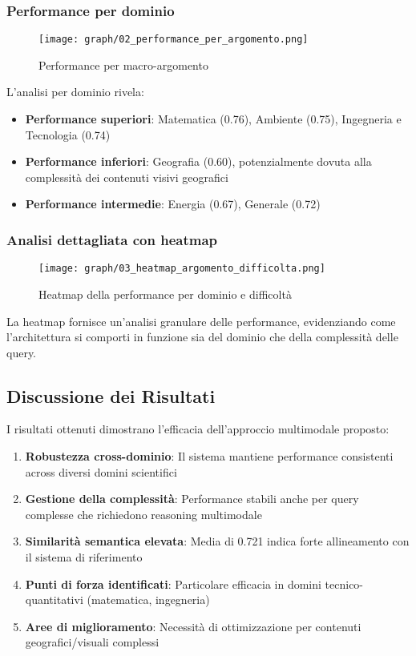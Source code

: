\documentclass[12pt,a4paper]{article}
\begin{document}
\subsubsection{Performance per dominio}
\begin{figure}[H]
\centering
\texttt{[image: graph/02\_performance\_per\_argomento.png]}
\caption{Performance per macro-argomento}
\label{fig:domain_performance}
\end{figure}

L'analisi per dominio rivela:

\begin{itemize}
    \item \textbf{Performance superiori}: Matematica (0.76), Ambiente (0.75), Ingegneria e Tecnologia (0.74)
    \item \textbf{Performance inferiori}: Geografia (0.60), potenzialmente dovuta alla complessità dei contenuti visivi geografici
    \item \textbf{Performance intermedie}: Energia (0.67), Generale (0.72)
\end{itemize}

\subsubsection{Analisi dettagliata con heatmap}
\begin{figure}[H]
\centering
\texttt{[image: graph/03\_heatmap\_argomento\_difficolta.png]}
\caption{Heatmap della performance per dominio e difficoltà}
\label{fig:heatmap_analysis}
\end{figure}

La heatmap fornisce un'analisi granulare delle performance, evidenziando come l'architettura si comporti in funzione sia del dominio che della complessità delle query.

\subsection{Discussione dei Risultati}
I risultati ottenuti dimostrano l'efficacia dell'approccio multimodale proposto:

\begin{enumerate}
    \item \textbf{Robustezza cross-dominio}: Il sistema mantiene performance consistenti across diversi domini scientifici
    \item \textbf{Gestione della complessità}: Performance stabili anche per query complesse che richiedono reasoning multimodale
    \item \textbf{Similarità semantica elevata}: Media di 0.721 indica forte allineamento con il sistema di riferimento
    \item \textbf{Punti di forza identificati}: Particolare efficacia in domini tecnico-quantitativi (matematica, ingegneria)
    \item \textbf{Aree di miglioramento}: Necessità di ottimizzazione per contenuti geografici/visuali complessi
\end{enumerate}
\end{document}
